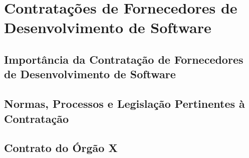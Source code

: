 \chapter{Contratações de Fornecedores de Desenvolvimento de Software}
\label{chap:metricas}

\section{Importância da Contratação de Fornecedores de Desenvolvimento de Software}




\section{Normas, Processos e Legislação Pertinentes à Contratação}



\section{Contrato do Órgão X}



